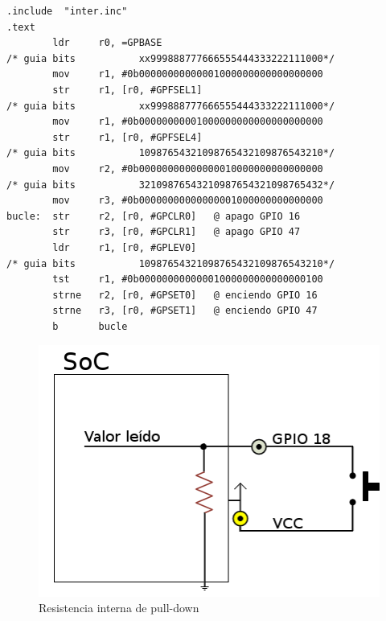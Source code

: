 \begin{lstlisting}[caption={apend3.s},label={lst:codigoApendice_3}]
        .include  "inter.inc"
.text
        ldr     r0, =GPBASE
/* guia bits           xx999888777666555444333222111000*/
        mov     r1, #0b00000000000001000000000000000000
        str     r1, [r0, #GPFSEL1]
/* guia bits           xx999888777666555444333222111000*/
        mov     r1, #0b00000000001000000000000000000000
        str     r1, [r0, #GPFSEL4]
/* guia bits           10987654321098765432109876543210*/
        mov     r2, #0b00000000000000010000000000000000
/* guia bits           32109876543210987654321098765432*/
        mov     r3, #0b00000000000000001000000000000000
bucle:  str     r2, [r0, #GPCLR0]   @ apago GPIO 16
        str     r3, [r0, #GPCLR1]   @ apago GPIO 47
        ldr     r1, [r0, #GPLEV0]
/* guia bits           10987654321098765432109876543210*/
        tst     r1, #0b00000000000001000000000000000100
        strne   r2, [r0, #GPSET0]   @ enciendo GPIO 16
        strne   r3, [r0, #GPSET1]   @ enciendo GPIO 47
        b       bucle
\end{lstlisting}

\begin{figure}[h]
  \centering
    \includegraphics[width=13cm]{graphs/pulldown.png}
  \caption{Resistencia interna de pull-down}
  \label{fig:pulldown}
\end{figure}

\chapterend
